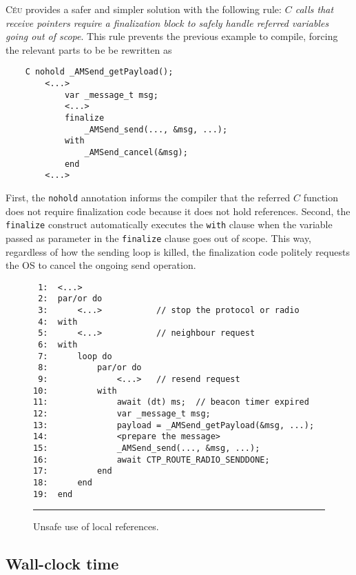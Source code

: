 \documentclass[10pt]{sensys-proc}
\newcommand{\CEU}{\textsc{C\'{e}u}\xspace}
\newcommand{\code}[1] {{\small{\texttt{#1}}}}
\begin{document}
\CEU provides a safer and simpler solution with the following rule:
\emph{$C$ calls that receive pointers require a finalization block to safely 
handle referred variables going out of scope}.
This rule prevents the previous example to compile, forcing the relevant parts 
to be be rewritten as

{\small
\begin{verbatim}
    C nohold _AMSend_getPayload();
        <...>
            var _message_t msg;
            <...>
            finalize
                _AMSend_send(..., &msg, ...);
            with
                _AMSend_cancel(&msg);
            end
        <...>
\end{verbatim}
}

First, the \code{nohold} annotation informs the compiler that the referred $C$ 
function does not require finalization code because it does not hold 
references.
Second, the \code{finalize} construct automatically executes the \code{with} 
clause when the variable passed as parameter in the \code{finalize} clause goes 
out of scope.
This way, regardless of how the sending loop is killed, the finalization code 
politely requests the OS to cancel the ongoing send operation.

\begin{figure}[t]
{\small
\begin{verbatim}
 1:  <...>
 2:  par/or do
 3:      <...>           // stop the protocol or radio
 4:  with
 5:      <...>           // neighbour request
 6:  with
 7:      loop do
 8:          par/or do
 9:              <...>   // resend request
10:          with
11:              await (dt) ms;  // beacon timer expired
12:              var _message_t msg;
13:              payload = _AMSend_getPayload(&msg, ...);
14:              <prepare the message>
15:              _AMSend_send(..., &msg, ...);
16:              await CTP_ROUTE_RADIO_SENDDONE;
17:          end
18:      end
19:  end
\end{verbatim}
}
\rule{8.5cm}{0.37pt}
\caption{ Unsafe use of local references.
\label{lst.local}
}
\end{figure}

\subsection{Wall-clock time}
\label{sec.ceu.time}
\end{document}
